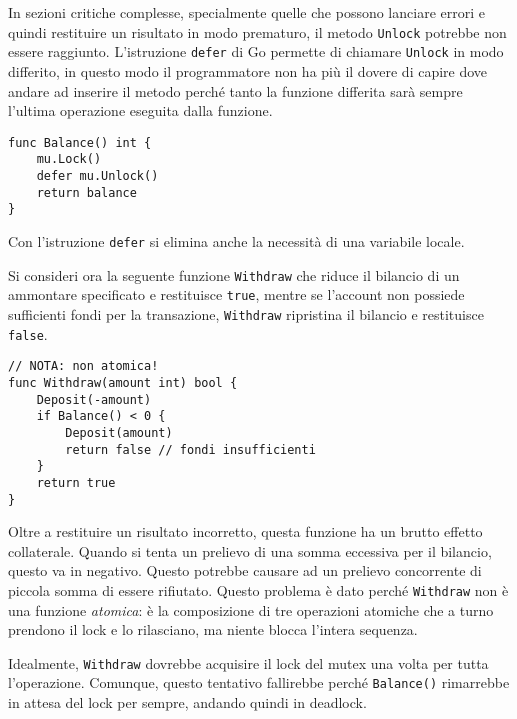 In sezioni critiche complesse, specialmente quelle che possono lanciare errori e quindi restituire un risultato in modo prematuro, il metodo \verb|Unlock| potrebbe non essere raggiunto.
L'istruzione \verb|defer| di Go permette di chiamare \verb|Unlock| in modo differito, in questo modo il programmatore non ha più il dovere di capire dove andare ad inserire il metodo perché tanto la funzione differita sarà sempre l'ultima operazione eseguita dalla funzione.
\begin{lstlisting}[frame=single, label={lst:lstlisting9-2.4}]
func Balance() int {
    mu.Lock()
    defer mu.Unlock()
    return balance
}
\end{lstlisting}
Con l'istruzione \verb|defer| si elimina anche la necessità di una variabile locale.

Si consideri ora la seguente funzione \verb|Withdraw| che riduce il bilancio di un ammontare specificato e restituisce \verb|true|, mentre se l'account non possiede sufficienti fondi per la transazione, \verb|Withdraw| ripristina il bilancio e restituisce \verb|false|.
\begin{lstlisting}[frame=single, label={lst:lstlisting9-2.5}]
// NOTA: non atomica!
func Withdraw(amount int) bool {
    Deposit(-amount)
    if Balance() < 0 {
        Deposit(amount)
        return false // fondi insufficienti
    }
    return true
}
\end{lstlisting}
Oltre a restituire un risultato incorretto, questa funzione ha un brutto effetto collaterale.
Quando si tenta un prelievo di una somma eccessiva per il bilancio, questo va in negativo.
Questo potrebbe causare ad un prelievo concorrente di piccola somma di essere rifiutato.
Questo problema è dato perché \verb|Withdraw| non è una funzione \textit{atomica}: è la composizione di tre operazioni atomiche che a turno prendono il lock e lo rilasciano, ma niente blocca l'intera sequenza.

Idealmente, \verb|Withdraw| dovrebbe acquisire il lock del mutex una volta per tutta l'operazione.
Comunque, questo tentativo fallirebbe perché \verb|Balance()| rimarrebbe in attesa del lock per sempre, andando quindi in deadlock.

